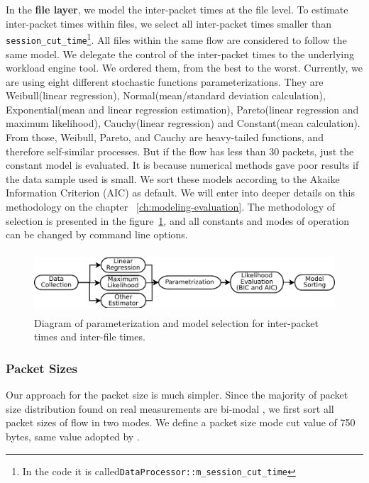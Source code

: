 In the \textbf{file layer}, we model the inter-packet times at the file level. To estimate inter-packet times within files, we select all inter-packet times smaller than \texttt{session\_cut\_time}\footnote{In the code it is called\texttt{DataProcessor::m\_session\_cut\_time} }. All files within the same flow are considered to follow the same model. We delegate the control of the inter-packet times to the underlying workload engine tool. We ordered them, from the best to the worst. Currently, we are using eight different stochastic functions parameterizations. They are Weibull(linear regression), Normal(mean/standard deviation calculation), Exponential(mean and linear regression estimation), Pareto(linear regression and maximum likelihood), Cauchy(linear regression) and Constant(mean calculation). From those, Weibull, Pareto, and Cauchy are heavy-tailed functions, and therefore self-similar processes. But if the flow has less than 30 packets, just the constant model is evaluated. It is because numerical methods gave poor results if the data sample used is small. We sort these models according to the Akaike Information Criterion (AIC) as default\cite{sourcesonoff-paper}\cite{bic-aic-comparision}. We will enter into deeper details on this methodology on the chapter ~\ref{ch:modeling-evaluation}. The methodology of selection is presented in the figure~\ref{fig:model-parameterization}, and all constants and modes of operation can be changed by command line options.


\begin{figure}[ht!]
    \centering
    \includegraphics[height=0.9in]{figures/ch3/simitar-parametrization}
    \caption{Diagram of parameterization and model selection for inter-packet times and inter-file times.}
    \label{fig:model-parameterization}
\end{figure}


\subsubsection{Packet Sizes}



Our approach for the packet size is much simpler. Since the majority of packet size distribution found on real measurements are bi-modal \cite{packet-distribution-model}\cite{sourcesonoff-paper}\cite{udp-flows-model}, we first sort all packet sizes of flow in two modes. We define a packet size mode cut value of 750 bytes, same value adopted by \cite{udp-flows-model}. 


